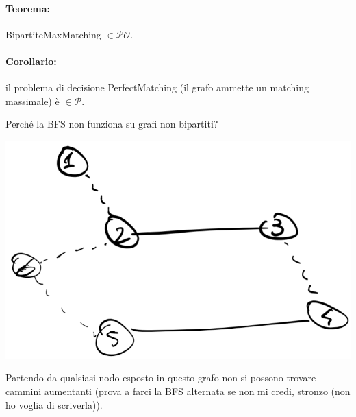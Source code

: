 \paragraph{Teorema:} BipartiteMaxMatching $\in \mathcal{PO}$.\\

\paragraph{Corollario:} il problema di decisione PerfectMatching (il grafo ammette un matching massimale) è $\in \mathcal{P}$.\\

\newpage

Perché la BFS non funziona su grafi non bipartiti?
\begin{center}
	\includegraphics[width=0.8\columnwidth]{img/bipartito1}
\end{center}
Partendo da qualsiasi nodo esposto in questo grafo non si possono trovare cammini aumentanti (prova a farci la BFS alternata se non mi credi, stronzo (non ho voglia di scriverla)).\\

\newpage
